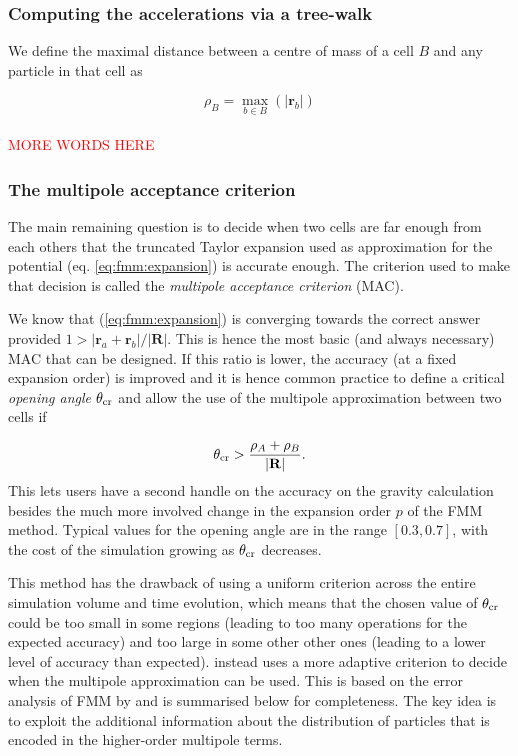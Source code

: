 \subsubsection{Computing the accelerations via a tree-walk}

We define the maximal distance between a centre of mass of a cell $B$ and
any particle in that cell as

\begin{equation}
  \rho_B = \max_{b \in B}(|\mathbf{r}_b|)
\end{equation}
\\
\textcolor{red}{MORE WORDS HERE}

\subsubsection{The multipole acceptance criterion}

The main remaining question is to decide when two cells are far enough from
each others that the truncated Taylor expansion used as approximation for
the potential (eq. \ref{eq:fmm:expansion}) is accurate enough. The
criterion used to make that decision is called the \emph{multipole
  acceptance criterion} (MAC).

We know that (\ref{eq:fmm:expansion}) is converging towards the correct
answer provided $1>|\mathbf{r}_a + \mathbf{r}_b| / |\mathbf{R}|$. This is
hence the most basic (and always necessary) MAC that can be designed. If
this ratio is lower, the accuracy (at a fixed expansion order) is improved
and it is hence common practice to define a critical \emph{opening angle}
$\theta_{\rm cr}$ and allow the use of the multipole approximation between
two cells if

\begin{equation}
  \theta_{\rm cr} > \frac{\rho_A + \rho_B} {|\mathbf{R}|}.
  \label{eq:fmm:angle}
\end{equation}
This lets users have a second handle on the accuracy on the gravity
calculation besides the much more involved change in the expansion order
$p$ of the FMM method. Typical values for the opening angle are in the
range $[0.3, 0.7]$, with the cost of the simulation growing as $\theta_{\rm
  cr}$ decreases.

This method has the drawback of using a uniform criterion across the entire
simulation volume and time evolution, which means that the chosen value of
$\theta_{\rm cr}$ could be too small in some regions (leading to too many
operations for the expected accuracy) and too large in some other other
ones (leading to a lower level of accuracy than expected). \swift instead
uses a more adaptive criterion to decide when the multipole approximation
can be used. This is based on the error analysis of FMM by
\cite{Dehnen2014} and is summarised below for completeness. The key idea is
to exploit the additional information about the distribution of particles
that is encoded in the higher-order multipole terms.

